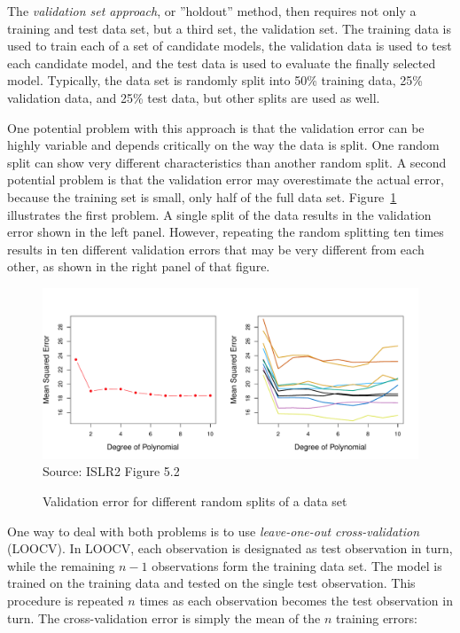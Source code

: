 The \emph{validation set approach}, or ''holdout'' method, then requires not only a training and test data set, but a third set, the validation set. The training data is used to train each of a set of candidate models, the validation data is used to test each candidate model, and the test data is used to evaluate the finally selected model. Typically, the data set is randomly split into 50\% training data, 25\% validation data, and 25\% test data, but other splits are used as well. 

One potential problem with this approach is that the validation error can be highly variable and depends critically on the way the data is split. One random split can show very different characteristics than another random split. A second potential problem is that the validation error may overestimate the actual error, because the training set is small, only half of the full data set. Figure~\ref{fig:holdout} illustrates the first problem. A single split of the data results in the validation error shown in the left panel. However, repeating the random splitting ten times results in ten different validation errors that may be very different from each other, as shown in the right panel of that figure.

\begin{figure}[b]
\centering 

\includegraphics[width=.9\textwidth]{Figures_Chapters_1-6/Chapter5/5_2.pdf}
\scriptsize Source: ISLR2 Figure 5.2
\caption{Validation error for different random splits of a data set}
\label{fig:holdout}
\end{figure}

One way to deal with both problems is to use \emph{leave-one-out cross-validation} (LOOCV). In LOOCV, each observation is designated as test observation in turn, while the remaining $n-1$ observations form the training data set. The model is trained on the training data and tested on the single test observation. This procedure is repeated $n$ times as each observation becomes the test observation in turn. The cross-validation error is simply the mean of the $n$ training errors:

